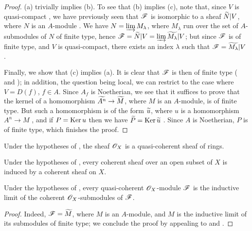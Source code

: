 \begin{proof}
\label{proof-1.1.5.1}
(a) trivially implies (b).
To see that (b) implies (c), note that, since $V$ is quasi-compact , we have previously seen that $\mathscr{F}$ is isomorphic to a sheaf ${\widetilde{N}}|V$, where $N$ is an $A$-module .
We have $N=\varinjlim M_\lambda$, where $M_\lambda$ run over the set of $A$-submodules of $N$ of finite type, hence  $\mathscr{F}={\widetilde{N}}|V=\varinjlim{\widetilde{M_\lambda}}|V$;
but since $\mathscr{F}$ is of finite type, and $V$ is quasi-compact, there exists an index $\lambda$ such that $\mathscr{F}={\widetilde{M_\lambda}}|V$ .

Finally, we show that (c) implies (a).
It is clear that $\mathscr{F}$ is then of finite type ( and );
in addition, the question being local, we can restrict to the case where $V=D(f)$, $f\in A$.
Since $A_f$ is Noetherian, we see that it suffices to prove that the kernel of a homomorphism $\wt{A^n}\to\wt{M}$, where $M$ is an $A$-module, is of finite type.
But such a homomorphism is of the form ${\widetilde{u}}$, where $u$ is a homomorphism $A^n\to M$ , and if $P={\mathop{\mathrm{Ker}}\nolimits}\, u$ then we have ${\widetilde{P}}={\mathop{\mathrm{Ker}}\nolimits}\,{\widetilde{u}}$ .
Since $A$ is Noetherian, $P$ is of finite type, which finishes the proof.
\end{proof}

\begin{cor}[1.5.2]
\label{1.1.5.2}
Under the hypotheses of , the sheaf $\mathscr{O}_X$ is a quasi-coherent sheaf of rings.
\end{cor}

\begin{cor}[1.5.3]
\label{1.1.5.3}
Under the hypotheses of , every coherent sheaf over an open subset of $X$ is induced by a coherent sheaf on $X$.
\end{cor}

\begin{cor}[1.5.4]
\label{1.1.5.4}
Under the hypotheses of , every quasi-coherent $\mathscr{O}_X$-module $\mathscr{F}$ is the inductive limit of the coherent $\mathscr{O}_X$-submodules of $\mathscr{F}$.
\end{cor}

\begin{proof}
\label{proof-1.1.5.4}
Indeed, $\mathscr{F}={\widetilde{M}}$, where $M$ is an $A$-module, and $M$ is the inductive limit of its submodules of finite type;
we conclude the proof by appealing to  and .
\end{proof}

